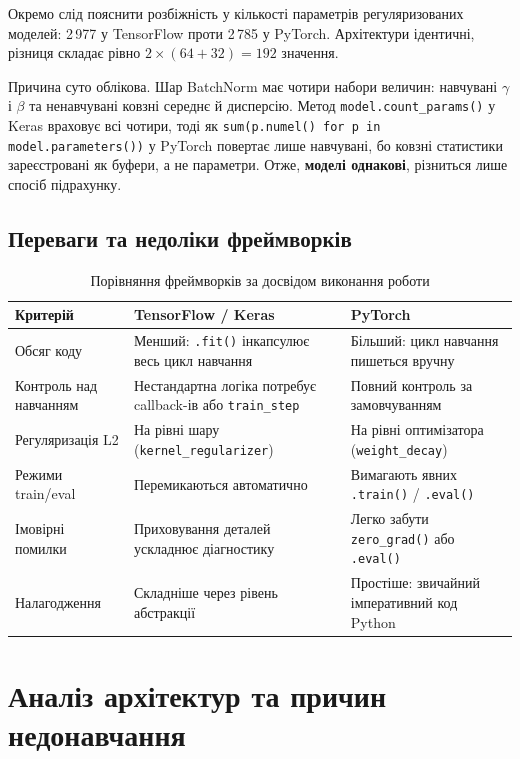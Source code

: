 \documentclass[14pt,a4paper]{extreport}
\begin{document}
Окремо слід пояснити розбіжність у кількості параметрів регуляризованих моделей: 2\,977 у TensorFlow проти 2\,785 у PyTorch. Архітектури ідентичні, різниця складає рівно $2 \times (64 + 32) = 192$ значення.

Причина суто облікова. Шар BatchNorm має чотири набори величин: навчувані $\gamma$ і $\beta$ та ненавчувані ковзні середнє й дисперсію. Метод \texttt{model.count\_params()} у Keras враховує всі чотири, тоді як \texttt{sum(p.numel() for p in model.parameters())} у PyTorch повертає лише навчувані, бо ковзні статистики зареєстровані як буфери, а не параметри. Отже, \textbf{моделі однакові}, різниться лише спосіб підрахунку.

\subsection{Переваги та недоліки фреймворків}

\begin{table}[H]
\caption{Порівняння фреймворків за досвідом виконання роботи}
\label{tab:prosandcons}
\begin{tabularx}{\linewidth}{|l|X|X|}
\hline
\textbf{Критерій} & \textbf{TensorFlow / Keras} & \textbf{PyTorch} \\
\hline
Обсяг коду & Менший: \texttt{.fit()} інкапсулює весь цикл навчання & Більший: цикл навчання пишеться вручну \\
\hline
Контроль над навчанням & Нестандартна логіка потребує callback-ів або \texttt{train\_step} & Повний контроль за замовчуванням \\
\hline
Регуляризація L2 & На рівні шару (\texttt{kernel\_regularizer}) & На рівні оптимізатора (\texttt{weight\_decay}) \\
\hline
Режими train/eval & Перемикаються автоматично & Вимагають явних \texttt{.train()} / \texttt{.eval()} \\
\hline
Імовірні помилки & Приховування деталей ускладнює діагностику & Легко забути \texttt{zero\_grad()} або \texttt{.eval()} \\
\hline
Налагодження & Складніше через рівень абстракції & Простіше: звичайний імперативний код Python \\
\hline
\end{tabularx}
\end{table}

\section{Аналіз архітектур та причин недонавчання}
\end{document}
